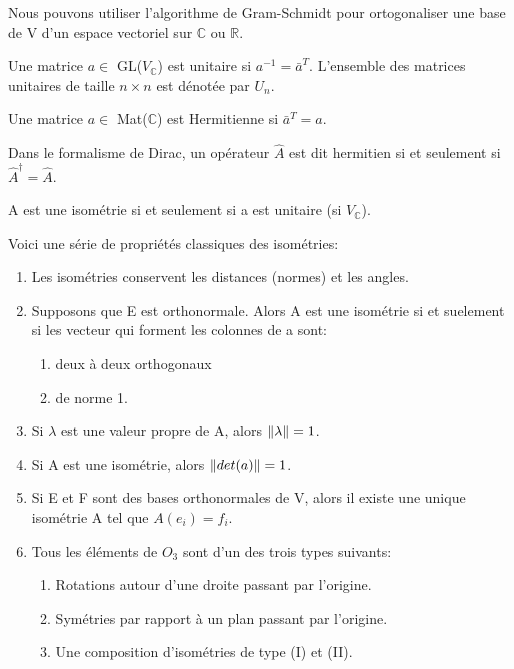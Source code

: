 \documentclass[../notesdecours.tex]{subfiles}
\begin{document}
Nous pouvons utiliser l'algorithme de Gram-Schmidt pour ortogonaliser une base de V d'un espace vectoriel sur $\mathbb{C}$ ou $\mathbb{R}$.\\

\begin{definition} Une matrice $a \in$ GL($V_{\mathbb{C}}$) est unitaire si $a^{-1} = \bar{a}^T$. L'ensemble des matrices unitaires de taille $n \times n$ est dénotée par $U_n$. \label{Unitaire}\end{definition}

\begin{definition} Une matrice $a \in$ Mat($\mathbb{C}$) est Hermitienne si $\bar{a}^T = a$. \label{Hermitienne}\end{definition}

\begin{remark}
	Dans le formalisme de Dirac, un opérateur $\hat{A}$ est dit hermitien si et seulement si $\hat{A}^\dagger = \hat{A}$.
\end{remark}

\begin{Property} A est une isométrie si et seulement si a est unitaire (si $V_\mathbb{C}$). \end{Property}

Voici une série de propriétés classiques des isométries:
\begin{enumerate}
\item Les isométries conservent les distances (normes) et les angles.
\item Supposons que E est orthonormale. Alors A est une isométrie si et suelement si les vecteur qui forment les colonnes de a sont:
	\begin{enumerate}
	\item deux à deux orthogonaux
	\item de norme 1.
	\end{enumerate}
\item Si $\lambda$ est une valeur propre de A, alors $\norm{\lambda} = 1$.
\item Si A est une isométrie, alors $\norm{det(a)} = 1$.
\item Si E et F sont des bases orthonormales de V, alors il existe une unique isométrie A tel que $A(e_i) = f_i$.
\item Tous les éléments de $O_3$ sont d'un des trois types suivants:
	\begin{enumerate}
	\item Rotations autour d'une droite passant par l'origine.
	\item Symétries par rapport à un plan passant par l'origine.
	\item Une composition d'isométries de type (I) et (II).
	\end{enumerate}
\end{enumerate}
\end{document}
